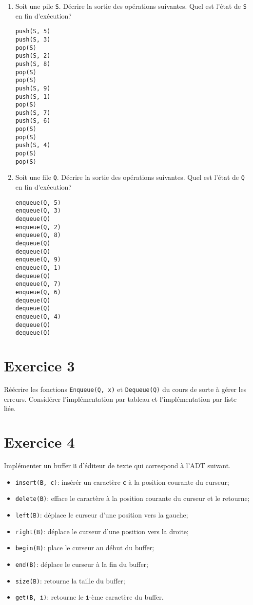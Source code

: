 \documentclass[a4paper,10pt]{article}
\begin{document}
\begin{enumerate}
\item Soit une pile \texttt{S}. Décrire la sortie des opérations suivantes. Quel est l'état de \texttt{S} en fin d'exécution?

\begin{verbatim}
push(S, 5)
push(S, 3)
pop(S)
push(S, 2)
push(S, 8)
pop(S)
pop(S)
push(S, 9)
push(S, 1)
pop(S)
push(S, 7)
push(S, 6)
pop(S)
pop(S)
push(S, 4)
pop(S)
pop(S)
\end{verbatim}

\item Soit une file \texttt{Q}. Décrire la sortie des opérations suivantes. Quel est l'état de \texttt{Q} en fin d'exécution?

\begin{verbatim}
enqueue(Q, 5)
enqueue(Q, 3)
dequeue(Q)
enqueue(Q, 2)
enqueue(Q, 8)
dequeue(Q)
dequeue(Q)
enqueue(Q, 9)
enqueue(Q, 1)
dequeue(Q)
enqueue(Q, 7)
enqueue(Q, 6)
dequeue(Q)
dequeue(Q)
enqueue(Q, 4)
dequeue(Q)
dequeue(Q)
\end{verbatim}

\end{enumerate}

\section*{Exercice 3}

Réécrire les fonctions \texttt{Enqueue(Q, x)} et \texttt{Dequeue(Q)} du cours de sorte à gérer les erreurs. Considérer l'implémentation par tableau et l'implémentation par liste liée.

\section*{Exercice 4}

Implémenter un buffer \texttt{B} d'éditeur de texte qui correspond à l'ADT suivant.

\begin{itemize}
\item \texttt{insert(B, c)}: insérér un caractère \texttt{c} à la position courante du curseur;
\item \texttt{delete(B)}: efface le caractère à la position courante du curseur et le retourne;
\item \texttt{left(B)}: déplace le curseur d'une position vers la gauche;
\item \texttt{right(B)}: déplace le curseur d'une position vers la droite;
\item \texttt{begin(B)}: place le curseur au début du buffer;
\item \texttt{end(B)}: déplace le curseur à la fin du buffer;
\item \texttt{size(B)}: retourne la taille du buffer;
\item \texttt{get(B, i)}: retourne le \texttt{i}-ème caractère du buffer.
\end{itemize}
\end{document}
